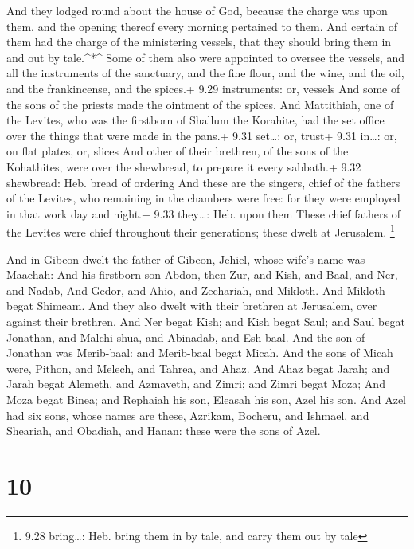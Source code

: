  And they lodged round about the house of God, because the
charge was upon them, and the opening thereof every morning pertained to
them.  And certain of them had the charge of the
ministering vessels, that they should bring them in and out by
tale.\^{}*\^{}  Some of them also were appointed to oversee
the vessels, and all the instruments of the sanctuary, and the fine
flour, and the wine, and the oil, and the frankincense, and the spices.+
9.29 instruments: or, vessels  And some of the sons of the
priests made the ointment of the spices.  And Mattithiah,
one of the Levites, who was the firstborn of Shallum the Korahite, had
the set office over the things that were made in the pans.+ 9.31
set\ldots: or, trust+ 9.31 in\ldots: or, on flat plates, or, slices
 And other of their brethren, of the sons of the
Kohathites, were over the shewbread, to prepare it every sabbath.+ 9.32
shewbread: Heb. bread of ordering  And these are the
singers, chief of the fathers of the Levites, who remaining in the
chambers were free: for they were employed in that work day and night.+
9.33 they\ldots: Heb. upon them  These chief fathers of the
Levites were chief throughout their generations; these dwelt at
Jerusalem. \footnote{9.28 bring\ldots: Heb. bring them in by tale, and
  carry them out by tale}

 And in Gibeon dwelt the father of Gibeon, Jehiel, whose
wife's name was Maachah:  And his firstborn son Abdon, then
Zur, and Kish, and Baal, and Ner, and Nadab,  And Gedor,
and Ahio, and Zechariah, and Mikloth.  And Mikloth begat
Shimeam. And they also dwelt with their brethren at Jerusalem, over
against their brethren.  And Ner begat Kish; and Kish begat
Saul; and Saul begat Jonathan, and Malchi-shua, and Abinadab, and
Esh-baal.  And the son of Jonathan was Merib-baal: and
Merib-baal begat Micah.  And the sons of Micah were,
Pithon, and Melech, and Tahrea, and Ahaz.  And Ahaz begat
Jarah; and Jarah begat Alemeth, and Azmaveth, and Zimri; and Zimri begat
Moza;  And Moza begat Binea; and Rephaiah his son, Eleasah
his son, Azel his son.  And Azel had six sons, whose names
are these, Azrikam, Bocheru, and Ishmael, and Sheariah, and Obadiah, and
Hanan: these were the sons of Azel.

\hypertarget{section-9}{%
\section{10}\label{section-9}}

